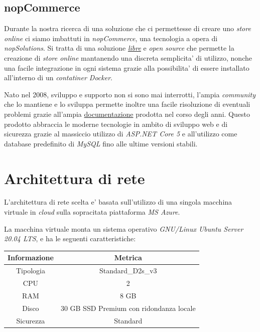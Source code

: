 \documentclass[a4paper]{report}
\begin{document}
		\subsection{nopCommerce}\label{nopcommerce}
			Durante la nostra ricerca di una soluzione che ci permettesse di creare uno \emph{store online} ci siamo
			imbattuti in \emph{nopCommerce}, una tecnologia a opera di \emph{nopSolutions}. Si tratta di una soluzione
			\href{https://github.com/nopSolutions/nopCommerce/blob/develop/LICENSE.md}{\emph{libre}} e
			\emph{open source} che permette la creazione di \emph{store online} mantanendo una discreta
			semplicita' di utilizzo, nonche una facile integrazione in ogni sistema grazie alla possibilita' di essere
			installato all'interno di un \emph{contatiner Docker}.

			Nato nel 2008, sviluppo e supporto non si sono mai interrotti, l'ampia \emph{community} che lo mantiene
			e lo sviluppa permette inoltre una facile risoluzione di eventuali problemi grazie all'ampia
			\href{https://docs.nopcommerce.com/en/developer/index.html?utm\_source=github&utm\_medium=referral&utm\_campaign=documentation&utm\_content=text}{documentazione}
			prodotta nel corso degli anni. Questo prodotto abbraccia le moderne tecnologie in ambito di sviluppo web e
			di sicurezza grazie al massiccio utilizzo di \emph{ASP.NET Core 5} e all'utilizzo come database predefinito
			di \emph{MySQL} fino alle ultime versioni stabili. 
	\newpage
	\section{Architettura di rete}\label{architettura_di_rete}%
		L'architettura di rete scelta e' basata sull'utilizzo di una singola macchina virtuale in \emph{cloud} sulla
		sopracitata piattaforma \emph{MS Azure}.

		La macchina virtuale monta un sistema operativo \emph{GNU/Linux Ubuntu Server 20.04 LTS}, e ha le seguenti
		caratteristiche:
		\begin{center}
			\begin{tabular}{c c}
				Informazione & Metrica \\
				\midrule
				Tipologia & Standard\_D2s\_v3 \\
				CPU & 2 \\
				RAM & 8 GB \\
				Disco & 30 GB SSD Premium con ridondanza locale \\
				Sicurezza & Standard \\
			\end{tabular}
		\end{center}
\end{document}
